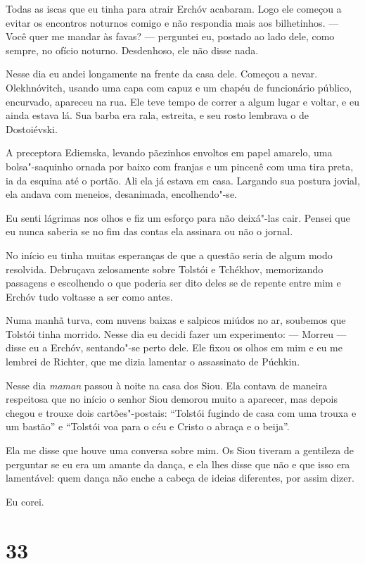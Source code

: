 Todas as iscas que eu tinha para atrair Erchóv acabaram. Logo ele
começou a evitar os encontros noturnos comigo e não respondia mais aos
bilhetinhos. --- Você quer me mandar às favas? --- perguntei eu, postado
ao lado dele, como sempre, no ofício noturno. Desdenhoso, ele não disse
nada.

Nesse dia eu andei longamente na frente da casa dele. Começou a nevar.
Olekhnóvitch, usando uma capa com capuz e um chapéu de funcionário
público, encurvado, apareceu na rua. Ele teve tempo de correr a algum
lugar e voltar, e eu ainda estava lá. Sua barba era rala, estreita, e
seu rosto lembrava o de Dostoiévski.

A preceptora Ediemska, levando pãezinhos envoltos em papel amarelo, uma
bolsa"-saquinho ornada por baixo com franjas e um pincenê com uma tira
preta, ia da esquina até o portão. Ali ela já estava em casa. Largando
sua postura jovial, ela andava com meneios, desanimada, encolhendo"-se.

Eu senti lágrimas nos olhos e fiz um esforço para não deixá"-las cair.
Pensei que eu nunca saberia se no fim das contas ela assinara ou não o
jornal.

No início eu tinha muitas esperanças de que a questão seria de algum
modo resolvida. Debruçava zelosamente sobre Tolstói e Tchékhov,
memorizando passagens e escolhendo o que poderia ser dito deles se de
repente entre mim e Erchóv tudo voltasse a ser como antes.

Numa manhã turva, com nuvens baixas e salpicos miúdos no ar, soubemos
que Tolstói tinha morrido. Nesse dia eu decidi fazer um experimento: ---
Morreu --- disse eu a Erchóv, sentando"-se perto dele. Ele fixou os olhos
em mim e eu me lembrei de Richter, que me dizia lamentar o assassinato
de Púchkin.

Nesse dia \emph{maman} passou à noite na casa dos Siou. Ela contava de
maneira respeitosa que no início o senhor Siou demorou muito a aparecer,
mas depois chegou e trouxe dois cartões"-postais: ``Tolstói fugindo de
casa com uma trouxa e um bastão'' e ``Tolstói voa para o céu e Cristo o
abraça e o beija''.

Ela me disse que houve uma conversa sobre mim. Os Siou tiveram a
gentileza de perguntar se eu era um amante da dança, e ela lhes disse
que não e que isso era lamentável: quem dança não enche a cabeça de
ideias diferentes, por assim dizer.

Eu corei.

\section{33}

